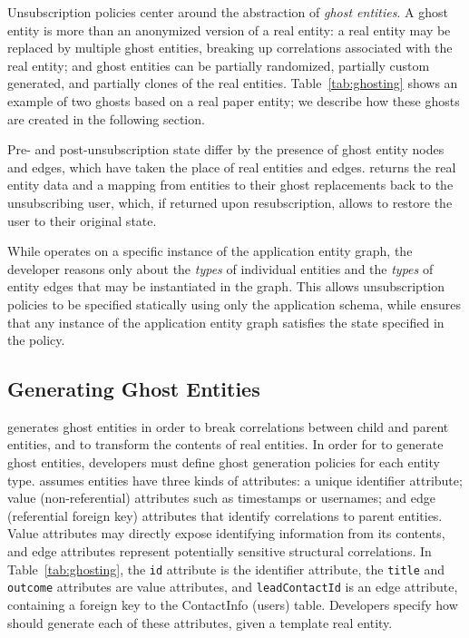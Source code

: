 Unsubscription policies center around the abstraction of \emph{ghost entities}. A ghost entity is
more than an anonymized version of a real entity: a real entity may be replaced by multiple ghost
entities, breaking up correlations associated with the real entity; and ghost entities can be
partially randomized, partially custom generated, and partially clones of the real entities.
Table~\ref{tab:ghosting} shows an example of two ghosts based on a real paper entity; we describe
how these ghosts are created in the following section.

Pre- and post-unsubscription state differ by the presence of ghost entity nodes and edges, which
have taken the place of real entities and edges. \sys returns the real entity data and a mapping
from entities to their ghost replacements back to the unsubscribing user, which, if returned upon
resubscription, allows \sys to restore the user to their original state.

While \sys operates on a specific instance of the application entity graph, the developer reasons
only about the \emph{types} of individual entities and the \emph{types} of entity edges that may be
instantiated in the graph. This allows unsubscription policies to be specified statically using only
the application schema, while \sys ensures that any instance of the application entity graph
satisfies the state specified in the policy.

\subsection{Generating Ghost Entities}
\label{sec:ghosting}

\sys generates ghost entities in order to break correlations between child and parent entities, and
to transform the contents of real entities. 
In order for \sys to generate ghost entities, developers must define ghost generation policies for
each entity type.  \sys assumes entities have three kinds of attributes: a unique identifier
attribute; value (non-referential) attributes such as timestamps or usernames; and edge (referential
foreign key) attributes that identify correlations to parent entities.  Value attributes may
directly expose identifying information from its contents, and edge attributes represent potentially
sensitive structural correlations. In Table~\ref{tab:ghosting}, the \texttt{id} attribute is the
identifier attribute, the \texttt{title} and \texttt{outcome} attributes are value attributes, and
\texttt{leadContactId} is an edge attribute, containing a foreign key to the ContactInfo (users)
table.
Developers specify how \sys should generate each of these
attributes, given a template real entity.

